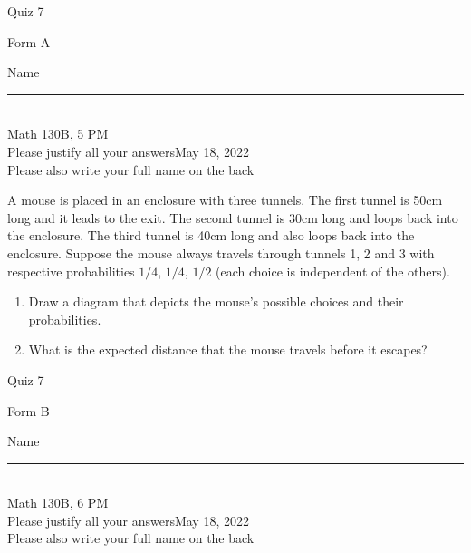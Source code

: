 \documentclass[12pt]{article}
\begin{document}
\begin{flushleft} 
\centerline{\LARGE{Quiz 7}} 
\vspace{5 mm}
{Form A}\hfill  
{Name \rule {2 in}{0.01in}}\\
Math 130B, 5 PM
\\
{Please justify all your answers}\hfill {May 18, 2022}
\\
{Please also write your full name on the back} 

\medskip
\end{flushleft}
	A mouse is placed in an enclosure with three tunnels.
	The first tunnel is 50cm long and it leads to the exit.
	The second tunnel is 30cm long and loops back into the enclosure.
	The third tunnel is 40cm long and also loops back into the enclosure.
	Suppose the mouse always travels through tunnels 1, 2 and 3 with respective probabilities $1/4$, $1/4$, $1/2$ (each choice is independent of the others).
\begin{enumerate}

	\item Draw a diagram that depicts the mouse's possible choices and their probabilities.

	\vfill

	\item What is the expected distance that the mouse travels before it escapes?

	\vfill\null
\end{enumerate}
\pagebreak


\begin{flushleft} 
\centerline{\LARGE{Quiz 7}} 
\vspace{5 mm}
{Form B}\hfill  
{Name \rule {2 in}{0.01in}}\\
Math 130B, 6 PM
\\
{Please justify all your answers}\hfill {May 18, 2022}
\\
{Please also write your full name on the back} 

\medskip
\end{flushleft}
\end{document}
